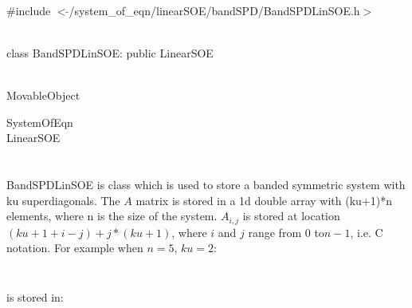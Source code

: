 
   \\
\#include $<\tilde{ }$/system\_of\_eqn/linearSOE/bandSPD/BandSPDLinSOE.h$>$  


  \\
class BandSPDLinSOE: public LinearSOE 


 \\
MovableObject 

\indent\indent SystemOfEqn \\
\indent\indent\indent LinearSOE \\
\indent\indent\indent{} \\

  \\
\indent BandSPDLinSOE is class which is used to store a banded symmetric system
with ku superdiagonals. The $A$ matrix is stored in a
1d double array with (ku+1)*n elements, where n is the size of the
system. $A_{i,j}$ is stored at location $(ku+1+i-j) +
j*(ku+1)$, where $i$ and $j$ range from $0$ to$n-1$, i.e. C
notation. For example when $n=5$, $ku = 2$: 


$$

$$


$$

$$


is stored in:


$$

$$


